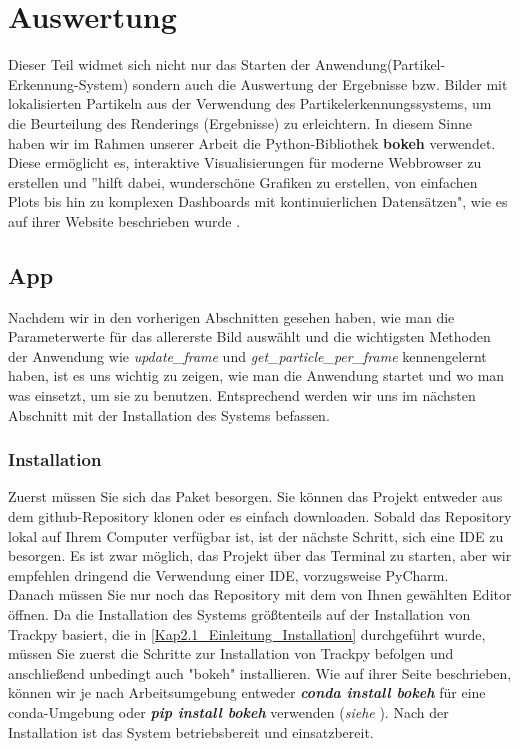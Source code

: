 \chapter{Auswertung \label{kap6}}
Dieser Teil widmet sich nicht nur das Starten der Anwendung(Partikel-Erkennung-System) sondern auch die Auswertung der Ergebnisse bzw. Bilder mit lokalisierten Partikeln aus der Verwendung des Partikelerkennungssystems, um die Beurteilung des Renderings (Ergebnisse) zu erleichtern.
In diesem Sinne haben wir im Rahmen unserer Arbeit die Python-Bibliothek \textbf{bokeh} verwendet. Diese ermöglicht es, interaktive Visualisierungen für moderne Webbrowser zu erstellen und ''hilft dabei, wunderschöne Grafiken zu erstellen, von einfachen Plots bis hin zu komplexen Dashboards mit kontinuierlichen Datensätzen", wie es auf ihrer Website beschrieben wurde \cite{bokeh}.

\section{App}
Nachdem wir in den vorherigen Abschnitten gesehen haben, wie man die Parameterwerte für das allererste Bild auswählt und die wichtigsten Methoden der Anwendung wie \textit{update\_frame} und \textit{get\_particle\_per\_frame} kennengelernt haben, ist es uns wichtig zu zeigen, wie man die Anwendung startet und wo man was einsetzt, um sie zu benutzen.
Entsprechend werden wir uns im nächsten Abschnitt mit der Installation des Systems befassen.

\subsection{Installation}
Zuerst müssen Sie sich das Paket besorgen. Sie können das Projekt entweder aus dem github-Repository \cite{particleTrackingSystem} klonen oder es einfach downloaden. Sobald das Repository lokal auf Ihrem Computer verfügbar ist, ist der nächste Schritt, sich eine IDE zu besorgen. Es ist zwar möglich, das Projekt über das Terminal zu starten, aber wir empfehlen dringend die Verwendung einer IDE, vorzugsweise PyCharm.\\
Danach müssen Sie nur noch das Repository mit dem von Ihnen gewählten Editor öffnen.  
Da die Installation des Systems größtenteils auf der Installation von Trackpy basiert, die in \ref{Kap2.1_Einleitung_Installation} durchgeführt wurde, müssen Sie zuerst die Schritte zur Installation von Trackpy befolgen und anschließend unbedingt auch "bokeh" installieren.   
Wie auf ihrer Seite beschrieben, können wir je nach Arbeitsumgebung entweder \textsl{\textbf{conda install bokeh}} für eine conda-Umgebung oder \textsl{\textbf{pip install bokeh}} verwenden (\textit{siehe} \cite{bokeh}).
Nach der Installation ist das System betriebsbereit und einsatzbereit.

